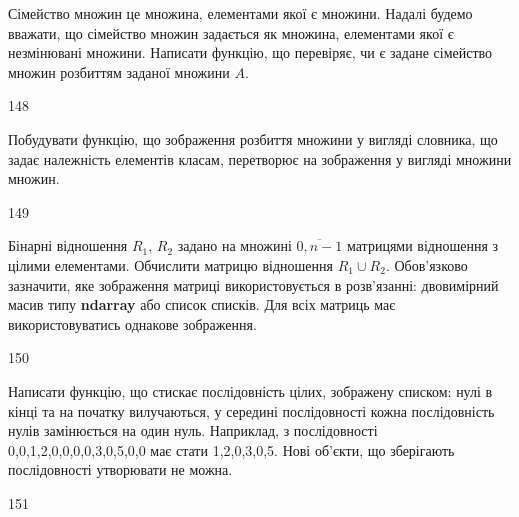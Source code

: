 Сімейство множин це множина, елементами якої є множини. Надалі будемо вважати, що сімейство множин задається як множина, елементами якої є незмінювані множини. Написати функцію, що перевіряє, чи є задане сімейство множин розбиттям заданої множини $A$.
\\\par
148 














Побудувати функцію, що зображення розбиття множини у вигляді словника, що задає належність елементів класам, перетворює на зображення у вигляді множини множин.
\\\par
149 














Бінарні відношення $R_1$, $R_2$ задано на множині $\overline{0,n-1}$ матрицями відношення з цілими елементами. Обчислити матрицю відношення $R_1\cup R_2$. Обов'язково зазначити, яке зображення матриці використовується в розв'язанні: двовимірний масив типу \textbf{ndarray} або список списків. Для всіх матриць має використовуватись однакове зображення.
\\\par
150 














Написати функцію, що стискає послідовність цілих, зображену списком: нулі в кінці та на початку вилучаються, у середині послідовності кожна послідовність нулів замінюється на один нуль. Наприклад, з послідовності 0,0,1,2,0,0,0,0,3,0,5,0,0 має стати 1,2,0,3,0,5. Нові об'єкти, що зберігають послідовності утворювати не можна.
\\\par
151 















